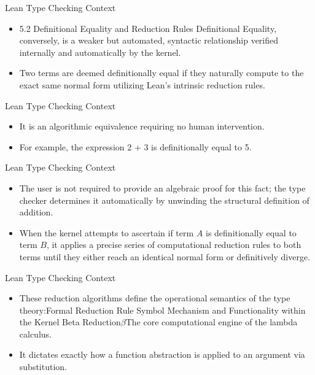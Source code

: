 \documentclass[10pt]{beamer}
\begin{document}
\begin{frame}{Lean Type Checking Context}
\begin{itemize}\setlength{\itemsep}{1.5em}
  \item 5.2 Definitional Equality and Reduction Rules Definitional Equality, conversely, is a weaker but automated, syntactic relationship verified internally and automatically by the kernel.
  \item Two terms are deemed definitionally equal if they naturally compute to the exact same normal form utilizing Lean's intrinsic reduction rules.
\end{itemize}
\end{frame}

\begin{frame}{Lean Type Checking Context}
\begin{itemize}\setlength{\itemsep}{1.5em}
  \item It is an algorithmic equivalence requiring no human intervention.
  \item For example, the expression 2 + 3 is definitionally equal to 5.
\end{itemize}
\end{frame}

\begin{frame}{Lean Type Checking Context}
\begin{itemize}\setlength{\itemsep}{1.5em}
  \item The user is not required to provide an algebraic proof for this fact; the type checker determines it automatically by unwinding the structural definition of addition.
  \item When the kernel attempts to ascertain if term $A$ is definitionally equal to term $B$, it applies a precise series of computational reduction rules to both terms until they either reach an identical normal form or definitively diverge.
\end{itemize}
\end{frame}

\begin{frame}{Lean Type Checking Context}
\begin{itemize}\setlength{\itemsep}{1.5em}
  \item These reduction algorithms define the operational semantics of the type theory:Formal Reduction Rule Symbol Mechanism and Functionality within the Kernel Beta Reduction$\beta$The core computational engine of the lambda calculus.
  \item It dictates exactly how a function abstraction is applied to an argument via substitution.
\end{itemize}
\end{frame}
\end{document}
